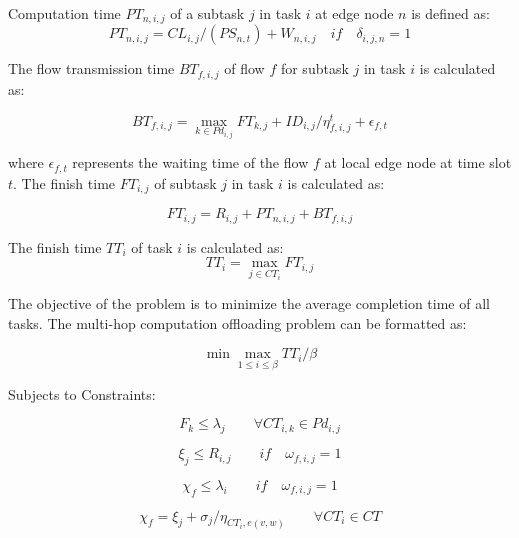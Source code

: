 \documentclass[10pt, conference, letterpaper]{IEEEtran}
\begin{document}
Computation time $PT_{n,i,j}$ of a subtask $j$ in task $i$ at edge node $n$ is defined as: 
\begin{equation}
    PT_{n,i,j} = CL_{i,j}/(PS_{n,t}) + W_{n,i,j} \quad  if \quad \delta_{i,j,n} = 1
\end{equation}

The flow transmission time $BT_{f,i,j}$ of flow $f$ for subtask $j$ in task $i$ is calculated as:

\begin{equation}
    BT_{f,i,j}=\max_{k \in Pd_{i,j}} FT_{k,j} + ID_{i,j} / \eta^t_{f,i,j} + \epsilon_{f,t}
\end{equation}


where $\epsilon_{f,t}$ represents the waiting time of the flow $f$ at local edge node at time slot $t$. The finish time $FT_{i,j}$ of subtask $j$ in task $i$ is calculated as:

\begin{equation}
FT_{i,j} = R_{i,j} + PT_{n,i,j} + BT_{f,i,j}
\end{equation}


The finish time $TT_i$ of task $i$ is calculated as:
\begin{equation}
    TT_i = \max_{j \in CT_i} FT_{i,j} 
\end{equation}

The objective of the problem is to minimize the average completion time of all tasks. The multi-hop computation offloading problem can be formatted as:

\begin{equation}
    \min \max_{1 \leq i \leq \beta} TT_i /\beta
\end{equation}

Subjects to Constraints:

\begin{equation}\label{cons5}
    F_k  \leq  \lambda_j \quad \quad {\forall} CT_{i,k} \in Pd_{i,j}
\end{equation}

\begin{equation}\label{cons6}
    \xi_j  \leq  R_{i,j} \quad \quad if  \quad \omega_{f,i,j} = 1
\end{equation}

\begin{equation}\label{cons7}
    \chi_f  \leq  \lambda_i \quad \quad if \quad \omega_{f,i,j} = 1
\end{equation}

\begin{equation}\label{cons8}
    \chi_f = \xi_j + \sigma_j / \eta_{CT_i,e(v,w)} \quad \quad {\forall} CT_i \in CT
\end{equation}
\end{document}
